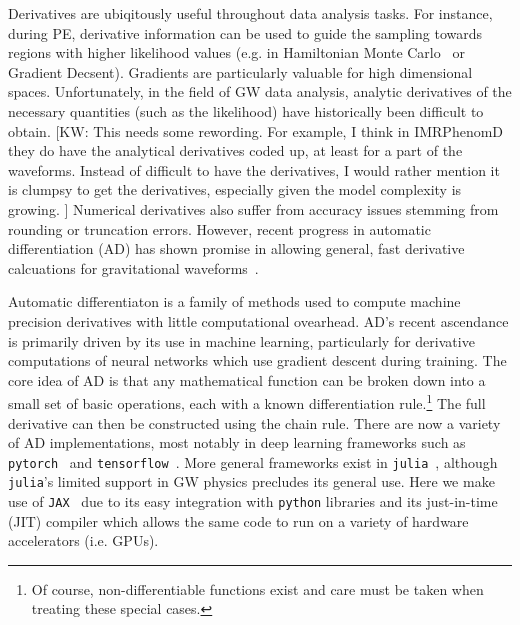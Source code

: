 \documentclass[twocolumn]{aastex631}
\newcommand{\jax}{\texttt{JAX}\xspace}
\newcommand{\kw}[1]{{\color{rb4}[KW: #1 ]}}
\begin{document}
Derivatives are ubiqitously useful throughout data analysis tasks.
For instance, during PE, derivative information can be used to guide the sampling towards regions with higher likelihood values (e.g. in Hamiltonian Monte Carlo~\citep{2017arXiv170102434B} or Gradient Decsent).
Gradients are particularly valuable for high dimensional spaces.
Unfortunately, in the field of GW data analysis, analytic derivatives of the necessary quantities (such as the likelihood) have historically been difficult to obtain. \kw{This needs some rewording. For example, I think in IMRPhenomD they do have the analytical derivatives coded up, at least for a part of the waveforms. Instead of difficult to have the derivatives, I would rather mention it is clumpsy to get the derivatives, especially given the model complexity is growing.}
Numerical derivatives also suffer from accuracy issues stemming from rounding or truncation errors.
However, recent progress in automatic differentiation (AD) has shown promise in allowing general, fast derivative calcuations for gravitational waveforms~\citep{Coogan:2022qxs}.

Automatic differentiaton is a family of methods used to compute machine precision derivatives with little computational ovearhead. 
AD's recent ascendance is primarily driven by its use in machine learning, particularly for derivative computations of neural networks which use gradient descent during training.
The core idea of AD is that any mathematical function can be broken down into a small set of basic operations, each with a known differentiation rule.\footnote{
    Of course, non-differentiable functions exist and care must be taken when treating these special cases.
    }
The full derivative can then be constructed using the chain rule.
There are now a variety of AD implementations, most notably in deep learning frameworks such as \texttt{pytorch}~\citep{pytorch} and \texttt{tensorflow}~\citep{tensorflow2015-whitepaper}.
More general frameworks exist in \texttt{julia}~\citep{zygote, forwarddiff}, although \texttt{julia}'s limited support in GW physics precludes its general use.
Here we make use of \jax~\citep{jax2018github} due to its easy integration with \texttt{python} libraries and its just-in-time (JIT) compiler which allows the same code to run on a variety of hardware accelerators (i.e. GPUs).
\end{document}
